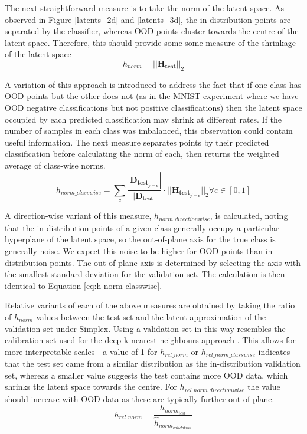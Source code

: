 \documentclass{article}
\begin{document}
The next straightforward measure is to take the norm of the latent space. As observed in Figure \ref{latents_2d} and \ref{latents_3d}, the in-distribution points are separated by the classifier, whereas OOD points cluster towards the centre of the latent space. Therefore, this should provide some some measure of the shrinkage of the latent space
\begin{equation}
\label{eq:h norm}
	h_{norm} = ||\bm{H_{test}}||_2
\end{equation}

A variation of this approach is introduced to address the fact that if one class has OOD points but the other does not (as in the MNIST experiment where we have OOD negative classifications but not positive classifications) then the latent space occupied by each predicted classification may shrink at different rates. If the number of samples in each class was imbalanced, this observation could contain useful information. The next measure separates points by their predicted classification before calculating the norm of each, then returns the weighted average of class-wise norms.
\begin{equation}
\label{eq:h norm classwise}
	h_{norm\_classwise} =\sum_c \frac{|\bm{D_{test_{\hat{y}=c}}}|}{|\bm{D_{test}}|} \cdot ||\bm{H_{test_{\hat{y}=c}}}||_2 \forall c \in  [0, 1]
\end{equation}

A direction-wise variant of this measure, $h_{norm\_directionwise}$, is calculated, noting that the in-distribution points of a given class generally occupy a particular hyperplane of the latent space, so the out-of-plane axis for the true class is generally noise. We expect this noise to be higher for OOD points than in-distribution points. The out-of-plane axis is determined by selecting the axis with the smallest standard deviation for the validation set. The calculation is then identical to Equation \ref{eq:h norm classwise}.

Relative variants of each of the above measures are obtained by taking the ratio of $h_{norm}$ values between the test set and the latent approximation of the validation set under Simplex. Using a validation set in this way resembles the calibration set used for the deep k-nearest neighbours approach \cite{papernot_deep_2018}. This allows for more interpretable scales---a value of 1 for $h_{rel\_norm}$ or $h_{rel\_norm\_classwise}$ indicates that the test set came from a similar distribution as the in-distribution validation set, whereas a smaller value suggests the test contains more OOD data, which shrinks the latent space towards the centre. For $h_{rel\_norm\_directionwise}$ the value should increase with OOD data as these are typically further out-of-plane.
\begin{equation}
\label{eq:relative h norm}
	h_{rel\_norm} = \frac{h_{norm_{test}}}{\hat{h}_{norm_{validation}}}
\end{equation}
\end{document}
